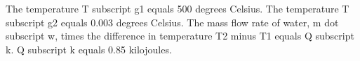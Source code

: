 The temperature T subscript g1 equals 500 degrees Celsius. The temperature T subscript g2 equals 0.003 degrees Celsius. The mass flow rate of water, m dot subscript w, times the difference in temperature T2 minus T1 equals Q subscript k. Q subscript k equals 0.85 kilojoules.